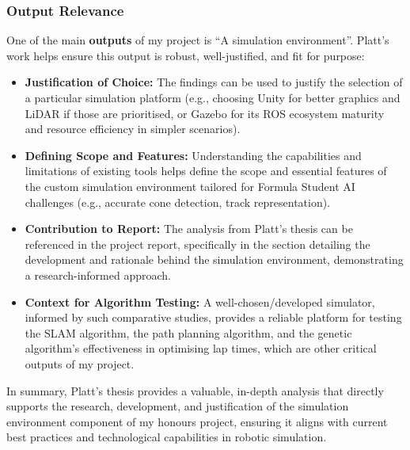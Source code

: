 \subsubsection{Output Relevance}
One of the main \textbf{outputs} of my project is ``A simulation environment''.
Platt's work helps ensure this output is robust, well-justified, and fit for purpose:
\begin{itemize}
    \item \textbf{Justification of Choice:} The findings can be used to justify the selection of a particular simulation platform (e.g., choosing Unity for better graphics and LiDAR if those are prioritised, or Gazebo for its ROS ecosystem maturity and resource efficiency in simpler scenarios).
    \item \textbf{Defining Scope and Features:} Understanding the capabilities and limitations of existing tools helps define the scope and essential features of the custom simulation environment tailored for Formula Student AI challenges (e.g., accurate cone detection, track representation).
    \item \textbf{Contribution to Report:} The analysis from Platt's thesis can be referenced in the project report, specifically in the section detailing the development and rationale behind the simulation environment, demonstrating a research-informed approach.
    \item \textbf{Context for Algorithm Testing:} A well-chosen/developed simulator, informed by such comparative studies, provides a reliable platform for testing the SLAM algorithm, the path planning algorithm, and the genetic algorithm's effectiveness in optimising lap times, which are other critical outputs of my project.
\end{itemize}
In summary, Platt's thesis provides a valuable, in-depth analysis that directly supports the research, development, and justification of the simulation environment component of my honours project, ensuring it aligns with current best practices and technological capabilities in robotic simulation.

